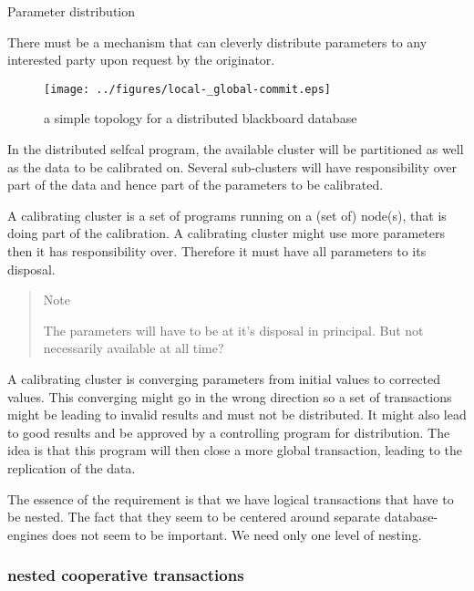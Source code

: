 \documentclass[]{lofar}
\begin{document}
      \begin{requirement}
        \caption{Parameter distribution\label{req:parameter-distribution}}
        There must be a mechanism that can cleverly distribute
        parameters to any interested party upon request by the
        originator.
      \end{requirement}

      \begin{figure}
        \texttt{[image: ../figures/local-\_global-commit.eps]}
        \hypertarget{fig:localGlobalCommit}{}
        \caption{a simple topology for a distributed blackboard database\label{fig:localGlobalCommit}}
      \end{figure}

      In the distributed selfcal program, the available cluster will
      be partitioned as well as the data to be calibrated on. Several
      sub-clusters will have responsibility over part of the data and
      hence part of the parameters to be calibrated.

      A calibrating cluster is a set of programs running on a (set of)
      node(s), that is doing part of the calibration.  A calibrating
      cluster might use more parameters then it has responsibility
      over. Therefore it must have all parameters to its
      disposal.

      \begin{verse}{Note}

        The parameters will have to be at it's disposal in
        principal. But not necessarily available at all time?

      \end{verse}

      A calibrating cluster is converging parameters from initial
      values to corrected values. This converging might go in the
      wrong direction so a set of transactions might be leading to
      invalid results and must not be distributed. It might also lead
      to good results and be approved by a controlling program for
      distribution. The idea is that this program will then close a
      more global transaction, leading to the replication of the data.

      The essence of the requirement is that we have logical
      transactions that have to be nested. The fact that they seem to
      be centered around separate database-engines does not seem to be
      important. We need only one level of nesting.

      \subsubsection{nested cooperative transactions}
      \label{subsubsec:nested-cooperative-transaction}\hypertarget{subsubsec:nested-cooperative-transaction}{}
\end{document}
